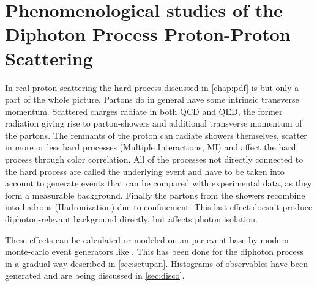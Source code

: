 \chapter{Phenomenological studies of the Diphoton Process Proton-Proton
  Scattering}%
\label{chap:pheno}

In real proton scattering the hard process discussed in
\cref{chap:pdf} is but only a part of the whole picture. Partons do in
general have some intrinsic transverse momentum.  Scattered charges
radiate in both QCD and QED, the former radiation giving rise to
parton-showers and additional transverse momentum of the partons. The
remnants of the proton can radiate showers themselves, scatter in more
or less hard processes (Multiple Interactions, MI) and affect the hard
process through color correlation. All of the processes not directly
connected to the hard process are called the underlying event and have
to be taken into account to generate events that can be compared with
experimental data, as they form a measurable background. Finally the
partons from the showers recombine into hadrons (Hadronization) due to
confinement. This last effect doesn't produce diphoton-relevant
background directly, but affects photon
isolation.~\cite[11]{buckley:2011ge} %

These effects can be calculated or modeled on an per-event base by
modern monte-carlo event generators like \sherpa. This has been done
for the diphoton process in a gradual way described in
\cref{sec:setupan}. Histograms of observables have been generated and
are being discussed in \cref{sec:disco}.


